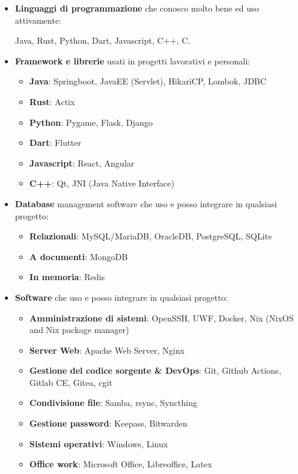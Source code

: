 \documentclass{paper}
\begin{document}
\begin{itemize}
    \item \textbf{Linguaggi di programmazione} che conosco molto bene ed uso attivamente:

    Java, Rust, Python, Dart, Javascript, C++, C.

    \item \textbf{Framework e librerie} usati in progetti lavorativi e personali:

    \begin{itemize}
        \item \textbf{Java}: Springboot, JavaEE (Servlet), HikariCP, Lombok, JDBC
        \item \textbf{Rust}: Actix
        \item \textbf{Python}: Pygame, Flask, Django
        \item \textbf{Dart}: Flutter
        \item \textbf{Javascript}: React, Angular
        \item \textbf{C++}: Qt, JNI (Java Native Interface)
    \end{itemize}

    \item \textbf{Database} management software che uso e posso integrare in qualsiasi progetto:

    \begin{itemize}
        \item \textbf{Relazionali}: MySQL/MariaDB, OracleDB, PostgreSQL, SQLite
        \item \textbf{A documenti}: MongoDB
        \item \textbf{In memoria}: Redis
    \end{itemize}

    \item \textbf{Software} che uso e posso integrare in qualsiasi progetto:

    \begin{itemize}
        \item \textbf{Amministrazione di sistemi}: OpenSSH, UWF, Docker, Nix (NixOS and Nix package manager)
        \item \textbf{Server Web}: Apache Web Server, Nginx
        \item \textbf{Gestione del codice sorgente \& DevOps}: Git, Github Actions, Gitlab CE, Gitea, cgit
        \item \textbf{Condivisione file}: Samba, rsync, Syncthing
        \item \textbf{Gestione password}: Keepass, Bitwarden
        \item \textbf{Sistemi operativi}: Windows, Linux
        \item \textbf{Office work}: Microsoft Office, Libreoffice, Latex
    \end{itemize}
\end{itemize}
\end{document}

